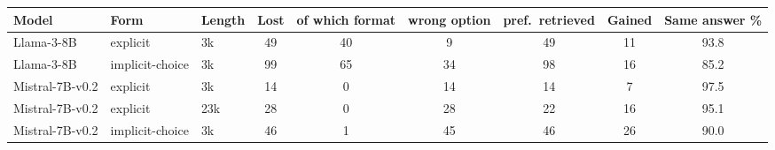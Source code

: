 \begin{tabular}{lll|cccc|c|c}
\toprule
Model & Form & Length & Lost & of which format & wrong option & pref.\ retrieved & Gained & Same answer \% \\
\midrule
Llama-3-8B & explicit & 3k & 49 & 40 & 9 & 49 & 11 & 93.8 \\
Llama-3-8B & implicit-choice & 3k & 99 & 65 & 34 & 98 & 16 & 85.2 \\
Mistral-7B-v0.2 & explicit & 3k & 14 & 0 & 14 & 14 & 7 & 97.5 \\
Mistral-7B-v0.2 & explicit & 23k & 28 & 0 & 28 & 22 & 16 & 95.1 \\
Mistral-7B-v0.2 & implicit-choice & 3k & 46 & 1 & 45 & 46 & 26 & 90.0 \\
\bottomrule
\end{tabular}
